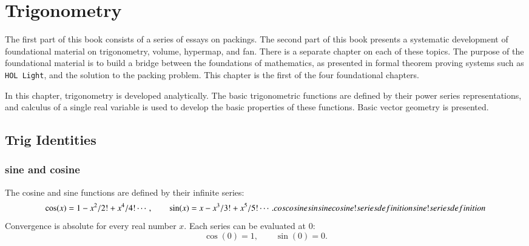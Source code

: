 

\chapter{Trigonometry}\label{part:trig}
%

The first part of this book consists of a series of essays
on packings.  The second part of this book presents
a systematic development of foundational material on
trigonometry, volume, hypermap, and fan.  There is a separate
chapter on each of these topics.  The purpose of the
foundational material is to build a bridge between
the foundations of mathematics, as presented in formal
theorem proving systems such as {\tt HOL Light}, and the
solution to the packing problem.  
This chapter is the first of the four foundational chapters.


In this chapter, trigonometry is developed analytically.  The basic
trigonometric functions are defined by their power series
representations, and calculus of a single real variable is used to
develop the basic properties of these functions.  Basic vector geometry is presented.

\section{Trig Identities}


\subsection{sine and cosine}

The cosine and sine functions are defined by their infinite series:%
%
    \begin{equation}\label{eqn:cos-def}\cos(x) = 1 - x^2/2! + x^4/4! \cdots,\qquad
  \sin(x) = x - x^3/3! + x^5/5! \cdots.
    \indy{Notation}{cos}%
    \indy{Index}{cosine}%
    \indy{Notation}{sin}%
    \indy{Index}{sine}%
    \indy{Index}{cosine!series definition}%
    \indy{Index}{sine!series definition}%
    \end{equation}
Convergence is absolute for every real number $x$.
Each series can be evaluated at $0$:
    \begin{equation}\label{eqn:cos0}
    \cos(0) = 1,\qquad \sin(0) = 0.
    \end{equation}

